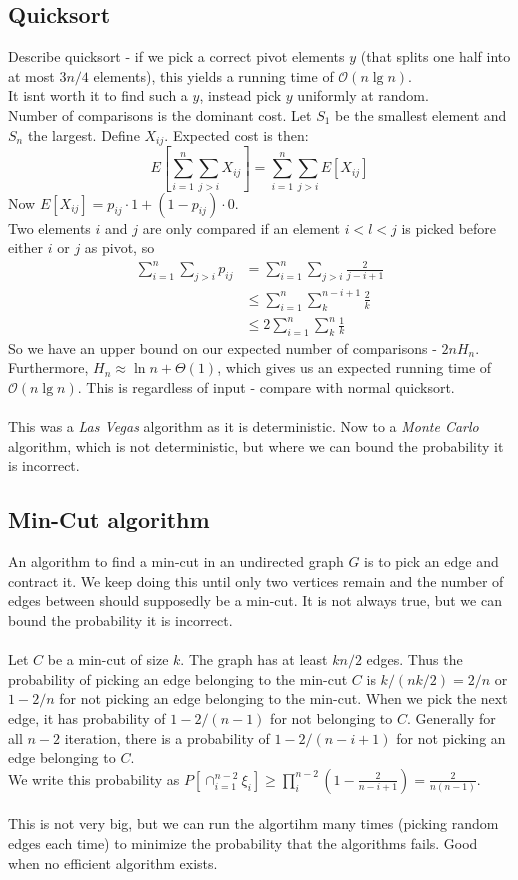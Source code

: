 \documentclass[a4paper, fleqn]{article}
\begin{document}
\subsection*{Quicksort}
Describe quicksort - if we pick a correct pivot elements $y$ (that splits one half into at most $3n/4$ elements), this yields a running time of $\mathcal{O}(n\lg n)$. \\
It isnt worth it to find such a $y$, instead pick $y$ uniformly at random. \\
Number of comparisons is the dominant cost. Let $S_1$ be the smallest element and $S_n$ the largest. Define $X_{ij}$. Expected cost is then:
$$E[\sum_{i=1}^n\sum_{j>i}X_{ij}]=\sum_{i=1}^n\sum_{j>i}E[X_{ij}]$$
Now $E[X_{ij}]=p_{ij}\cdot 1 + (1-p_{ij})\cdot 0$. \\
Two elements $i$ and $j$ are only compared if an element $i<l<j$ is picked before either $i$ or $j$ as pivot, so
\begin{align*}
\sum_{i=1}^n\sum_{j>i}p_{ij}&=\sum_{i=1}^n\sum_{j>i}\frac{2}{j-i+1} \\
&\leq \sum_{i=1}^n\sum_{k}^{n-i+1}\frac{2}{k} \\
&\leq 2\sum_{i=1}^n\sum_{k}^{n}\frac{1}{k}
\end{align*}
So we have an upper bound on our expected number of comparisons - $2nH_n$. \\
Furthermore, $H_n\approx \ln n+\Theta(1)$, which gives us an expected running time of $\mathcal{O}(n\lg n)$. This is regardless of input - compare with normal quicksort. \\
\\
This was a \textit{Las Vegas} algorithm as it is deterministic. Now to a \textit{Monte Carlo} algorithm, which is not deterministic, but where we can bound the probability it is incorrect.

\subsection*{Min-Cut algorithm}
An algorithm to find a min-cut in an undirected graph $G$ is to pick an edge and contract it. We keep doing this until only two vertices remain and the number of edges between should supposedly be a min-cut. It is not always true, but we can bound the probability it is incorrect. \\
\\
Let $C$ be a min-cut of size $k$. The graph has at least $kn/2$ edges. Thus the probability of picking an edge belonging to the min-cut $C$ is $k/(nk/2)=2/n$ or $1-2/n$ for not picking an edge belonging to the min-cut. When we pick the next edge, it has probability of $1-2/(n-1)$ for not belonging to $C$. Generally for all $n-2$ iteration, there is a probability of $1-2/(n-i+1)$ for not picking an edge belonging to $C$.\\
We write this probability as $P[\cap_{i=1}^{n-2} \xi_i]\geq \prod_i^{n-2} (1-\frac{2}{n-i+1})=\frac{2}{n(n-1)}$.\\
\\
This is not very big, but we can run the algortihm many times (picking random edges each time) to minimize the probability that the algorithms fails. Good when no efficient algorithm exists.
\end{document}
